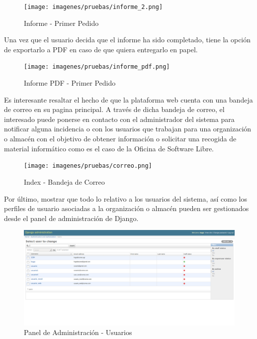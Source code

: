 \documentclass[a4paper,11pt]{book}
\begin{document}
\begin{figure}[H] 
\centering 
\texttt{[image: imagenes/pruebas/informe\_2.png]}
\caption{ Informe - Primer Pedido\cite{propio}}
\end{figure}

Una vez que el usuario decida que el informe ha sido completado, tiene la opción de exportarlo a PDF en caso de que quiera entregarlo en papel.
\begin{figure}[H] 
\centering 
\texttt{[image: imagenes/pruebas/informe\_pdf.png]}
\caption{ Informe PDF - Primer Pedido\cite{propio}}
\end{figure}

Es interesante resaltar el hecho de que la plataforma web cuenta con una bandeja de correo en su pagina principal. A través de dicha bandeja de correo, el interesado puede ponerse en contacto con el administrador del sistema para notificar alguna incidencia o con los usuarios que trabajan para una organización o  almacén con el objetivo de obtener información o solicitar una recogida de material informático como es el caso de la Oficina de Software Libre.  
 
\begin{figure}[H] 
\centering 
\texttt{[image: imagenes/pruebas/correo.png]}
\caption{ Index - Bandeja de Correo\cite{propio}}
\end{figure}

Por último, mostrar que todo lo relativo a los usuarios del sistema, así como los perfiles de usuario asociadas a la organización o almacén pueden ser gestionados desde el panel de administración de Django.  

\begin{figure}[H] 
\centering 
\includegraphics[scale=0.25]{imagenes/pruebas/admin.png}
\caption{ Panel de Administración - Usuarios\cite{propio}}
\end{figure}
\end{document}
